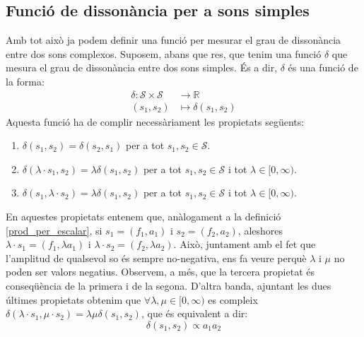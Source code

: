 \documentclass{article}
\theoremstyle{math}
\theoremstyle{TheoremNum}
\newcommand{\0}{\ensuremath{\vb{0}}}
\newcommand{\RR}{\ensuremath{\mathbb{R}}} %
\begin{document}
\subsection{Funció de dissonància per a sons simples}
Amb tot això ja podem definir una funció per mesurar el grau de dissonància entre dos sons complexos. Suposem, abans que res, que tenim una funció $\delta$ que mesura el grau de dissonància entre dos sons simples. És a dir, $\delta$ és una funció de la forma:
\begin{align*}
  \delta:\mathcal{S}\times\mathcal{S} & \longrightarrow\RR         \\
  (s_1,s_2)                           & \longmapsto\delta(s_1,s_2)
\end{align*}
Aquesta funció ha de complir necessàriament les propietats següents:
\begin{enumerate}[label=$\delta$\arabic*),ref=$\delta$\arabic*]
  \item\label{delta1} $\delta(s_1,s_2)=\delta(s_2,s_1)$ per a tot $s_1,s_2\in\mathcal{S}$.
  \item\label{delta2} $\delta(\lambda\cdot s_1,s_2)=\lambda\delta(s_1,s_2)$ per a tot $s_1,s_2\in\mathcal{S}$ i tot $\lambda\in[0,\infty)$.
  \item\label{delta3} $\delta(s_1,\lambda\cdot s_2)=\lambda\delta(s_1,s_2)$ per a tot $s_1,s_2\in\mathcal{S}$ i tot $\lambda\in[0,\infty)$.\par
\end{enumerate}
En aquestes propietats entenem que, anàlogament a la definició \ref{prod_per_escalar}, si $s_1=(f_1,a_1)$ i $s_2=(f_2,a_2)$, aleshores $\lambda\cdot s_1=(f_1,\lambda a_1)$ i $\lambda\cdot s_2=(f_2,\lambda a_2)$. Això, juntament amb el fet que l'amplitud de qualsevol so és sempre no-negativa, ens fa veure perquè $\lambda$ i $\mu$ no poden ser valors negatius. Observem, a més, que la tercera propietat és conseqüència de la primera i de la segona. D'altra banda, ajuntant les dues últimes propietats obtenim que $\forall\lambda,\mu\in[0,\infty)$ es compleix $\delta(\lambda\cdot s_1,\mu\cdot s_2)=\lambda\mu\delta(s_1,s_2)$, que és equivalent a dir: $$\delta(s_1,s_2)\propto a_1a_2$$
\end{document}
